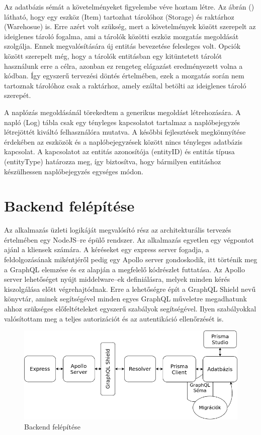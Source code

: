 Az adatbázis sémát a követelményeket figyelembe véve hoztam létre.
Az ábrán () látható, hogy egy eszköz (Item) tartozhat tárolóhoz (Storage) és raktárhoz (Warehosue) is. 
Erre azért volt szükség, mert a követelmények között szerepelt az ideiglenes tároló fogalma, ami a tárolók közötti eszköz mozgatás megoldását szolgálja.
Ennek megvalósítására új entitás bevezetése felesleges volt. Opciók között szerepelt még, hogy a tárolók entitásban egy kitüntetett tárolót használunk erre a célra, azonban ez rengeteg elágazást eredményezett volna a kódban.
Így egyszerű tervezési döntés értelmében, ezek a mozgatás során nem tartoznak tárolóhoz csak a raktárhoz, amely ezáltal betölti az ideiglenes tároló szerepét.

A naplózás megoldásánál törekedtem a generikus megoldást létrehozására.
A napló (Log) tábla csak egy tényleges kapcsolatot tartalmaz a naplóbejegyzés létrejöttét kiváltó felhasználóra mutatva.
A későbbi fejlesztések megkönnyítése érdekében az eszközök és a naplóbejegyzések között nincs tényleges adatbázis kapcsolat.
A kapcsolatot az entitás azonosítója (entityID) és entitás típusa (entityType) határozza meg, így biztosítva, hogy bármilyen entitáshoz készülhessen naplóbejegyzés egységes módon.

\section{Backend felépítése}
Az alkalmazás üzleti logikáját megvalósító rész az architekturális tervezés értelmében egy NodeJS–re épülő rendszer.
Az alkalmazás egyetlen egy végpontot ajánl a kliensek számára.
A kéréseket egy express server fogadja, a feldolgozásának mikéntjéről pedig egy Apollo server gondoskodik, itt történik meg a GraphQL elemzése és ez alapján a megfelelő kódrészlet futtatása.
Az Apollo server lehetőséget nyújt middelware–ek definiálásra, melyek minden kérés kiszolgálása előtt végrehajtódnak.
Erre a lehetőségre épít a GraphQL Shield nevű könyvtár, aminek segítségével minden egyes GraphQL műveletre megadhatunk ahhoz szükséges előfeltételeket egyszerű szabályok segítségével.
Ilyen szabályokkal valósítottam meg a teljes autorizációt és az autentikáció ellenőrzését is.

\begin{figure}[!ht]
  \centering
  \includegraphics[width=150mm, keepaspectratio]{figures/backend.png}
  \caption{Backend felépítése}
  \label{fig:backend}
\end{figure}

